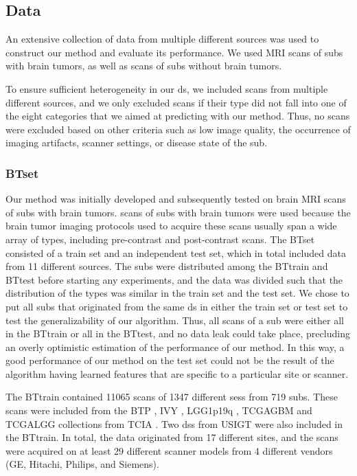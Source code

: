\subsection{Data}

An extensive collection of data from multiple different sources was used to construct our method and evaluate its performance.
We used \gls{MRI} \glspl{scan} of \glspl{sub} with brain tumors, as well as \glspl{scan} of \glspl{sub} without brain tumors.

To ensure sufficient heterogeneity in our \gls{ds}, we included \glspl{scan} from multiple different sources, and we only excluded \glspl{scan} if their \gls{type} did not fall into one of the eight categories that we aimed at predicting with our method.
Thus, no \glspl{scan} were excluded based on other criteria such as low image quality, the occurrence of imaging artifacts, scanner settings, or disease state of the \gls{sub}.

\subsubsection{\Acrlong{BTset}}
Our method was initially developed and subsequently tested on brain \gls{MRI} \glspl{scan} of \glspl{sub} with brain tumors.
\Glspl{scan} of \glspl{sub} with brain tumors were used because the brain tumor imaging protocols used to acquire these \glspl{scan} usually span a wide array of \glspl{type}, including pre-contrast and post-contrast \glspl{scan}.
The \gls{BTset} consisted of a train set and an independent test set, which in total included data from 11 different sources.
The \glspl{sub} were distributed among the \gls{BTtrain} and \gls{BTtest} before starting any experiments, and the data was divided such that the distribution of the \glspl{type} was similar in the train set and the test set.
We chose to put all \glspl{sub} that originated from the same \gls{ds} in either the train set or test set to test the generalizability of our algorithm.
Thus, all \glspl{scan} of a \gls{sub} were either all in the \gls{BTtrain} or all in the \gls{BTtest}, and no data leak could take place, precluding an overly optimistic estimation of the performance of our method.
In this way, a good performance of our method on the test set could not be the result of the algorithm having learned features that are specific to a particular \gls{site} or scanner.

The \gls{BTtrain} contained 11065 \glspl{scan} of 1347 different \glspl{ses} from 719 \glspl{sub}.
These \glspl{scan} were included from the \gls{BTP} \autocite{schmainda2018radiology}, \gls{IVY} \autocite{nameeta2016radiology}, \gls{LGG1p19q} \autocite{bradley2017radiology,akkus2017predicting}, \gls{TCGAGBM} \autocite{scarpace2016radiology} and \gls{TCGALGG} \autocite{pedano2016radiology} collections from \gls{TCIA} \autocite{clark2013cancer}.
Two \glspl{ds} from \gls{USIGT} \autocite{fyllingen2016glioblastoma,xiao2017retrospective} were also included in the \gls{BTtrain}.
In total, the data originated from 17 different \glspl{site}, and the \glspl{scan} were acquired on at least 29 different scanner models from 4 different vendors (GE, Hitachi, Philips, and Siemens).

